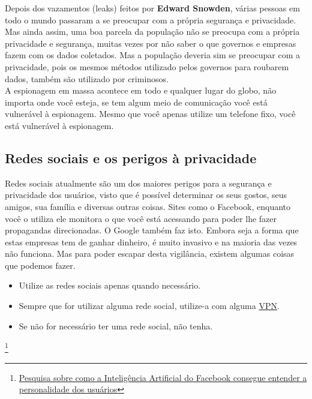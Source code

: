 \documentclass[12pt, letterpaper, DejaVuSansMono:12]{report}
\begin{document}
	Depois dos vazamentos (leaks) feitos por \textbf{Edward Snowden}, várias pessoas em todo o mundo passaram a se preocupar com a própria segurança e privacidade. Mas ainda assim, uma boa parcela da população não se preocupa com a própria privacidade e segurança, muitas vezes por não saber o que governos e empresas fazem com os dados coletados. Mas a população deveria sim se  preocupar com a privacidade, pois os mesmos métodos utilizado pelos governos para roubarem dados, também são utilizado por criminosos.\\

	A espionagem em massa acontece em todo e qualquer lugar do globo, não importa onde você esteja, se tem algum meio de comunicação você está vulnerável à espionagem. Mesmo que você apenas utilize um telefone fixo, você está vulnerável à espionagem.\\

\subsection{Redes sociais e os perigos à privacidade}

	Redes sociais atualmente são um dos maiores perigos para a segurança e privacidade dos usuários, visto que é possível determinar os seus gostos, seus amigos, sua família e diversas outras coisas. Sites como o Facebook, enquanto você o utiliza ele monitora o que você está acessando para poder lhe fazer propagandas direcionadas. O Google também faz isto. Embora seja a forma que estas empresas tem de ganhar dinheiro, é muito invasivo e na maioria das vezes não funciona. Mas para poder escapar desta vigilância, existem algumas coisas que podemos fazer.\\
	\begin{itemize} %
		\item Utilize as redes sociais apenas quando necessário.
		\item Sempre que for utilizar alguma rede social, utilize-a com alguma \href{https://criptowiki.miraheze.org/wiki/VPN_(Virtual_Private_Network)}{VPN}.
		\item Se não for necessário ter uma rede social, não tenha.
	\end{itemize} %

 \footnote{\href{http://www.pnas.org/content/112/4/1036.full.pdf}{Pesquisa sobre como a Inteligência Artificial do Facebook consegue entender a personalidade dos usuários}}

\pagebreak %
\end{document}
